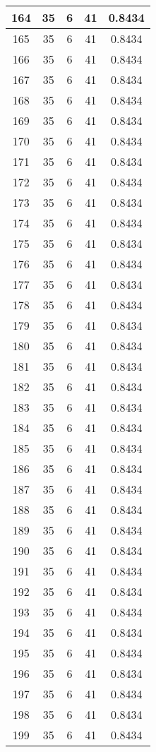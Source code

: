 \documentclass[letterpaper, 12pt]{article}
\begin{document}
\begin{longtable}{|c|c|c|c|c|}
\hline
164 & 35 & 6 & 41 & 0.8434 \\
\hline
165 & 35 & 6 & 41 & 0.8434 \\
\hline
166 & 35 & 6 & 41 & 0.8434 \\
\hline
167 & 35 & 6 & 41 & 0.8434 \\
\hline
168 & 35 & 6 & 41 & 0.8434 \\
\hline
169 & 35 & 6 & 41 & 0.8434 \\
\hline
170 & 35 & 6 & 41 & 0.8434 \\
\hline
171 & 35 & 6 & 41 & 0.8434 \\
\hline
172 & 35 & 6 & 41 & 0.8434 \\
\hline
173 & 35 & 6 & 41 & 0.8434 \\
\hline
174 & 35 & 6 & 41 & 0.8434 \\
\hline
175 & 35 & 6 & 41 & 0.8434 \\
\hline
176 & 35 & 6 & 41 & 0.8434 \\
\hline
177 & 35 & 6 & 41 & 0.8434 \\
\hline
178 & 35 & 6 & 41 & 0.8434 \\
\hline
179 & 35 & 6 & 41 & 0.8434 \\
\hline
180 & 35 & 6 & 41 & 0.8434 \\
\hline
181 & 35 & 6 & 41 & 0.8434 \\
\hline
182 & 35 & 6 & 41 & 0.8434 \\
\hline
183 & 35 & 6 & 41 & 0.8434 \\
\hline
184 & 35 & 6 & 41 & 0.8434 \\
\hline
185 & 35 & 6 & 41 & 0.8434 \\
\hline
186 & 35 & 6 & 41 & 0.8434 \\
\hline
187 & 35 & 6 & 41 & 0.8434 \\
\hline
188 & 35 & 6 & 41 & 0.8434 \\
\hline
189 & 35 & 6 & 41 & 0.8434 \\
\hline
190 & 35 & 6 & 41 & 0.8434 \\
\hline
191 & 35 & 6 & 41 & 0.8434 \\
\hline
192 & 35 & 6 & 41 & 0.8434 \\
\hline
193 & 35 & 6 & 41 & 0.8434 \\
\hline
194 & 35 & 6 & 41 & 0.8434 \\
\hline
195 & 35 & 6 & 41 & 0.8434 \\
\hline
196 & 35 & 6 & 41 & 0.8434 \\
\hline
197 & 35 & 6 & 41 & 0.8434 \\
\hline
198 & 35 & 6 & 41 & 0.8434 \\
\hline
199 & 35 & 6 & 41 & 0.8434 \\
\hline
\end{longtable}
\end{document}

